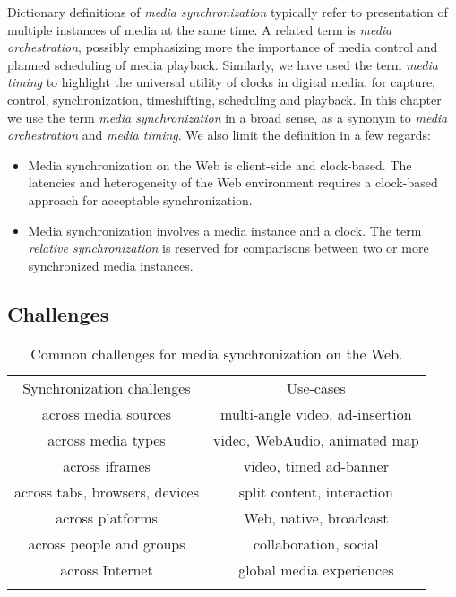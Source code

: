 Dictionary definitions of \emph{media synchronization} typically refer to
presentation of multiple instances of media at the same time. A related term
is \emph{media orchestration}, possibly emphasizing more the importance of
media control and planned scheduling of media playback. Similarly, we have
used the term \emph{media timing} to highlight the universal utility of clocks
in digital media, for capture, control, synchronization, timeshifting,
scheduling and playback. In this chapter we use the term \emph{media
synchronization} in a broad sense, as a synonym to \emph{media orchestration}
and \emph{media timing}. We also limit the definition in a few regards:

\begin{itemize}
\item{Media synchronization on the Web is client-side and clock-based. The latencies and heterogeneity of the Web environment requires a clock-based approach for acceptable synchronization.}
\item{Media synchronization involves a media instance and a clock. The term \emph{relative synchronization} is reserved for comparisons between two or more synchronized media instances.}
\end{itemize}

\subsection{Challenges}


\begin{table}
\centering
\caption{Common challenges for media synchronization on the Web.}
\label{tab:challenges}
\setlength{\tabcolsep}{10pt}
\begin{tabular}{cc}
\hline\noalign{\smallskip}
Synchronization challenges & Use-cases \\
\noalign{\smallskip}\svhline\noalign{\smallskip}
across media sources & multi-angle video, ad-insertion \\
across media types & video, WebAudio, animated map \\
across iframes & video, timed ad-banner \\
across tabs, browsers, devices & split content, interaction \\
across platforms & Web, native, broadcast \\
across people and groups & collaboration, social \\
across Internet & global media experiences \\
\noalign{\smallskip}\hline\noalign{\smallskip}
\end{tabular}
\end{table} 



